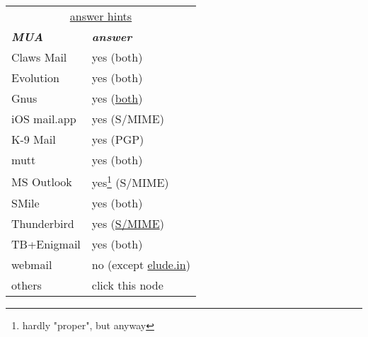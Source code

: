 \documentclass[12pt]{scrartcl}
\begin{document}
\begin{preview}
  \fontsize{4mm}{4mm}\selectfont 
  \begin{minipage}{6cm} %
    \begin{tabular}{lp{26mm}}
      \multicolumn{2}{|c|}{\underline{answer hints}}\\
      \textsl{\textbf{MUA}} & \textsl{\textbf{answer}}\\
      Claws Mail            & yes (both)\\
      Evolution             & yes (both)\\
      Gnus                  & yes (\href{https://www.emacswiki.org/emacs/GnusSMIME}{both})\\
      iOS mail.app          & yes (S/MIME)\\
      K-9 Mail              & yes (PGP)\\
      mutt                  & yes (both)\\
      MS Outlook            & yes\footnote[$\star$]{hardly "proper", but anyway} (S/MIME)\\
      SMile                 & yes (both)\\
      Thunderbird           & yes (\href{http://kb.mozillazine.org/Installing_an_SMIME_certificate}{S/MIME})\\
      TB+Enigmail           & yes (both)\\
      webmail               & no \tiny(except \href{eludemaillhqfkh5.onion}{elude.in})\\
      others                & click this node\\
    \end{tabular}
  \end{minipage}
\end{preview}
\end{document}
